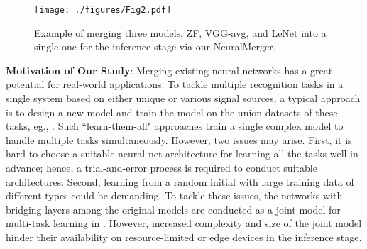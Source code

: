 \documentclass{article}
\begin{document}
	\begin{figure}[t]
		\begin{center}
			\texttt{[image: ./figures/Fig2.pdf]}
		\end{center}
		\vspace{-0.35cm}
		\caption{Example of merging three models, ZF, VGG-avg, and LeNet into a single one for the inference stage via our NeuralMerger.}
		\label{fig:mergemore}
	\end{figure}
	
	
	\vspace{0.2cm}
	\noindent \textbf{Motivation of Our Study}:
	Merging existing neural networks has a great potential for real-world applications.
	To tackle multiple recognition tasks in a single system based on either unique or various signal sources, a typical approach is to design a new model and train the model on the union datasets of these tasks, eg., \cite{DBLP:journals/corr/KaiserGSVPJU17,DBLP:journals/corr/AytarVT17}.
	Such ``learn-them-all" approaches train a single complex model to handle multiple tasks simultaneously.
	However, two issues may arise.
	First, it is hard to choose a suitable neural-net architecture for learning all the tasks well in advance;
	hence, a trial-and-error process is required to conduct suitable architectures.
	Second, learning from a random initial with large training data of different types could be demanding.
	To tackle these issues, the networks with bridging layers among the original models are conducted as a joint model for multi-task learning in \cite{RN274_multitask}.
	However, increased complexity and size of the joint model hinder their availability on resource-limited or edge devices in the inference stage.
	
\end{document}
